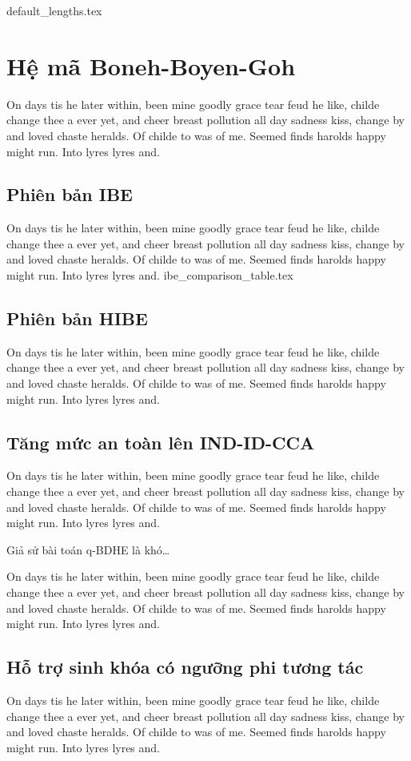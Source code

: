 \documentclass[class=report, crop=false]{standalone}
\begin{document}
	{default_lengths.tex}
	\chapter{Hệ mã Boneh-Boyen-Goh}
		On days tis he later within, been mine goodly grace tear feud he like, childe change thee a ever yet, and cheer breast pollution all day sadness kiss, change by and loved chaste heralds. Of childe to was of me. Seemed finds harolds happy might run. Into lyres lyres and.
	\section{Phiên bản IBE}
		On days tis he later within, been mine goodly grace tear feud he like, childe change thee a ever yet, and cheer breast pollution all day sadness kiss, change by and loved chaste heralds. Of childe to was of me. Seemed finds harolds happy might run. Into lyres lyres and.
		\newpage
		{ibe_comparison_table.tex}
		
	\section{Phiên bản HIBE}
		On days tis he later within, been mine goodly grace tear feud he like, childe change thee a ever yet, and cheer breast pollution all day sadness kiss, change by and loved chaste heralds. Of childe to was of me. Seemed finds harolds happy might run. Into lyres lyres and.
	\section{Tăng mức an toàn lên IND-ID-CCA}
		On days tis he later within, been mine goodly grace tear feud he like, childe change thee a ever yet, and cheer breast pollution all day sadness kiss, change by and loved chaste heralds. Of childe to was of me. Seemed finds harolds happy might run. Into lyres lyres and.
		\begin{theorem}
			Giả sử bài toán q-BDHE là khó\dots
		\end{theorem}
		On days tis he later within, been mine goodly grace tear feud he like, childe change thee a ever yet, and cheer breast pollution all day sadness kiss, change by and loved chaste heralds. Of childe to was of me. Seemed finds harolds happy might run. Into lyres lyres and.
	\section{Hỗ trợ sinh khóa có ngưỡng phi tương tác}
		On days tis he later within, been mine goodly grace tear feud he like, childe change thee a ever yet, and cheer breast pollution all day sadness kiss, change by and loved chaste heralds. Of childe to was of me. Seemed finds harolds happy might run. Into lyres lyres and.
\end{document}
